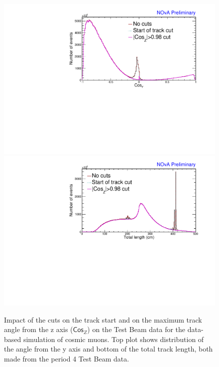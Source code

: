\begin{enumerate}
\begin{figure}[!ht]
\includegraphics[width=\textwidth]{Plots/TBCalibration/DBSim_SelectionComparisonCosZCut_CosY.pdf}
\includegraphics[width=\textwidth]{Plots/TBCalibration/DBSim_SelectionComparisonCosZCut_TotLength.pdf}
\caption[Track start and $\textsf{Cos}_Z$ cut for data-based simulation selection]{Impact of the cuts on the track start and on the maximum track angle from the z axis ($\textsf{Cos}_Z$) on the Test Beam data for the data-based simulation of cosmic muons. Top plot shows distribution of the angle from the y axis and bottom of the total track length, both made from the period 4 Test Beam data.}
\label{fig:DataBasedSimCosZSelectionComparison}
\end{figure}


\end{enumerate}
